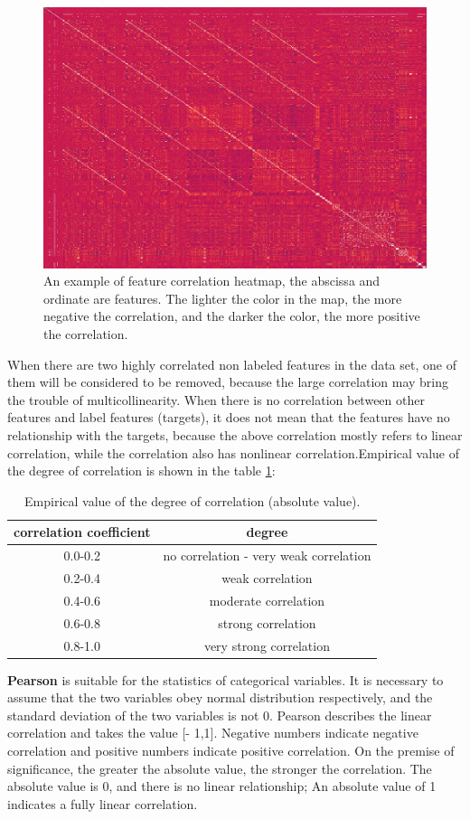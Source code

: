 \begin{figure}[ht]
    \centering
    \includegraphics[width=0.5\linewidth]{images/heatmap_MIMIC.png}
    \caption{An example of feature correlation heatmap, the abscissa and ordinate are features. The lighter the color in the map, the more negative the correlation, and the darker the color, the more positive the correlation.}
    \label{fig:heatmap_MIMIC}
\end{figure}
When there are two highly correlated non labeled features in the data set, one of them will be considered to be removed, because the large correlation may bring the trouble of multicollinearity. When there is no correlation between other features and label features (targets), it does not mean that the features have no relationship with the targets, because the above correlation mostly refers to linear correlation, while the correlation also has nonlinear correlation.Empirical value of the degree of correlation is shown in the table \ref{tab:Empirical value of the degree of correlation}:

\begin{table}[ht]
\centering
\caption{Empirical value of the degree of correlation (absolute value).}
\begin{tabular}{|c|c|}
\hline
\textbf{correlation coefficient} & 
\textbf{degree} \\ \hline
0.0-0.2  & 
no correlation - very weak correlation \\ \hline
0.2-0.4  & 
weak correlation \\ \hline
0.4-0.6  & 
moderate correlation \\ \hline
0.6-0.8  & 
strong correlation \\ \hline
0.8-1.0  & 
very strong correlation \\ \hline
\end{tabular}
\label{tab:Empirical value of the degree of correlation}
\end{table}

\textbf{Pearson} is suitable for the statistics of categorical variables. It is necessary to assume that the two variables obey normal distribution respectively, and the standard deviation of the two variables is not 0. Pearson describes the linear correlation and takes the value [- 1,1]. Negative numbers indicate negative correlation and positive numbers indicate positive correlation. On the premise of significance, the greater the absolute value, the stronger the correlation. The absolute value is 0, and there is no linear relationship; An absolute value of 1 indicates a fully linear correlation.

